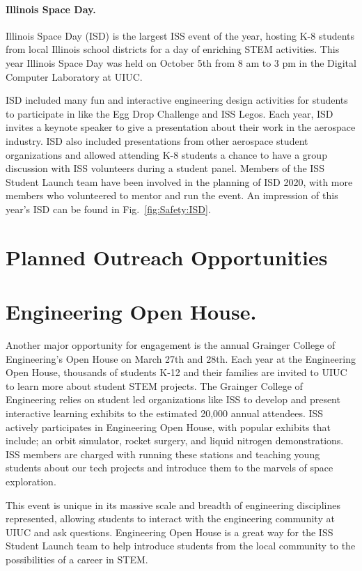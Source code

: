 \paragraph{Illinois Space Day.} Illinois Space Day (ISD) is the largest ISS event of the year, hosting K-8 students from local Illinois school districts for a day of enriching STEM activities. This year Illinois Space Day was held on October 5th from 8 am to 3 pm in the Digital Computer Laboratory at UIUC.

ISD included many fun and interactive engineering design activities for students to participate in like the Egg Drop Challenge and ISS Legos. Each year, ISD invites a keynote speaker to give a presentation about their work in the aerospace industry. ISD also included presentations from other aerospace student organizations and allowed attending K-8 students a chance to have a group discussion with ISS volunteers during a student panel. Members of the ISS Student Launch team have been involved in the planning of ISD 2020, with more members who volunteered to mentor and run the event. An impression of this year's ISD can be found in Fig.~\ref{fig:Safety:ISD}.


\section{Planned Outreach Opportunities}

\section{Engineering Open House.} Another major opportunity for engagement is the annual Grainger College of Engineering’s Open House on March 27th and 28th. Each year at the Engineering Open House, thousands of students K-12 and their families are invited to UIUC to learn more about student STEM projects. The Grainger College of Engineering relies on student led organizations like ISS to develop and present interactive learning exhibits to the estimated 20,000 annual attendees. ISS actively participates in Engineering Open House, with popular exhibits that include; an orbit simulator, rocket surgery, and liquid nitrogen demonstrations. ISS members are charged with running these stations and teaching young students about our tech projects and introduce them to the marvels of space exploration.

This event is unique in its massive scale and breadth of engineering disciplines represented, allowing students to interact with the engineering community at UIUC and ask questions. Engineering Open House is a great way for the ISS Student Launch team to help introduce students from the local community to the possibilities of a career in STEM.

